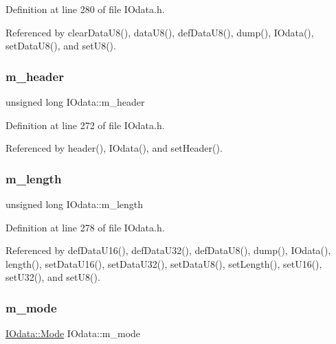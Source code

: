 Definition at line 280 of file I\+Odata.\+h.



Referenced by clear\+Data\+U8(), data\+U8(), def\+Data\+U8(), dump(), I\+Odata(), set\+Data\+U8(), and set\+U8().

\mbox{\label{classIOdata_a46ec7dbfa257c02be1d39c4799f157d3}} 
\subsubsection{\texorpdfstring{m\+\_\+header}{m\_header}}
{\footnotesize\ttfamily unsigned long I\+Odata\+::m\+\_\+header\hspace{0.3cm}{\ttfamily [private]}}



Definition at line 272 of file I\+Odata.\+h.



Referenced by header(), I\+Odata(), and set\+Header().

\mbox{\label{classIOdata_afabe57441da019eb614d277799106aac}} 
\subsubsection{\texorpdfstring{m\+\_\+length}{m\_length}}
{\footnotesize\ttfamily unsigned long I\+Odata\+::m\+\_\+length\hspace{0.3cm}{\ttfamily [private]}}



Definition at line 278 of file I\+Odata.\+h.



Referenced by def\+Data\+U16(), def\+Data\+U32(), def\+Data\+U8(), dump(), I\+Odata(), length(), set\+Data\+U16(), set\+Data\+U32(), set\+Data\+U8(), set\+Length(), set\+U16(), set\+U32(), and set\+U8().

\mbox{\label{classIOdata_a0782e31763fa855f1ecbd377dce538e6}} 
\subsubsection{\texorpdfstring{m\+\_\+mode}{m\_mode}}
{\footnotesize\ttfamily \hyperlink{classIOdata_a044e9a4a0c6d25a43ebfe29c4fa4f1e5}{I\+Odata\+::\+Mode} I\+Odata\+::m\+\_\+mode\hspace{0.3cm}{\ttfamily [private]}}



